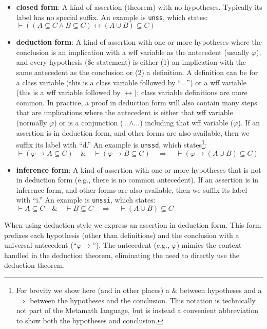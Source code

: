 \begin{itemize}
\item \textbf{closed form}:
A kind of assertion (theorem) with no hypotheses.
Typically its label has no special suffix.
An example is \texttt{unss}, which states:
$\vdash ( ( A \subseteq C \wedge B \subseteq C ) \leftrightarrow ( A \cup B )
\subseteq C )\label{eq:unss}$
\item \textbf{deduction form}:
A kind of assertion with one or more hypotheses
where the conclusion is an implication with
a wff variable as the antecedent (usually $\varphi$), and every hypothesis
(\$e statement)
is either (1) an implication with the same antecedent as the conclusion or
(2) a definition.
A definition
can be for a class variable (this is a class variable followed by ``='')
or a wff variable (this is a wff variable followed by $\leftrightarrow$);
class variable definitions are more common.
In practice, a proof
in deduction form will also contain many steps that are implications
where the antecedent is either that wff variable (normally $\varphi$)
or is
a conjunction (...$\land$...) including that wff variable ($\varphi$).
If an assertion is in deduction form, and other forms are also available,
then we suffix its label with ``d.''
An example is \texttt{unssd}, which states\footnote{
For brevity we show here (and in other places)
a $\&$\index{$\&$} between hypotheses
and a $\Rightarrow$\index{$\Rightarrow$}
between the hypotheses and the conclusion.
This notation is technically not part of the Metamath language, but is
instead a convenient abbreviation to show both the hypotheses and conclusion.}:
$\vdash ( \varphi \rightarrow A \subseteq C )\quad\&\quad \vdash ( \varphi
    \rightarrow B \subseteq C )\quad\Rightarrow\quad \vdash ( \varphi
    \rightarrow ( A \cup B ) \subseteq C )\label{eq:unssd}$
\item \textbf{inference form}:
A kind of assertion with one or more hypotheses that is not in deduction form
(e.g., there is no common antecedent).
If an assertion is in inference form, and other forms are also available,
then we suffix its label with ``i.''
An example is \texttt{unssi}, which states:
$\vdash A \subseteq C\quad\&\quad \vdash B \subseteq C\quad\Rightarrow\quad
    \vdash ( A \cup B ) \subseteq C\label{eq:unssi}$
\end{itemize}

When using deduction style we express an assertion in deduction form.
This form prefixes each hypothesis (other than definitions) and the
conclusion with a universal antecedent (``$\varphi \rightarrow$'').
The antecedent (e.g., $\varphi$)
mimics the context handled in the deduction theorem, eliminating
the need to directly use the deduction theorem.

